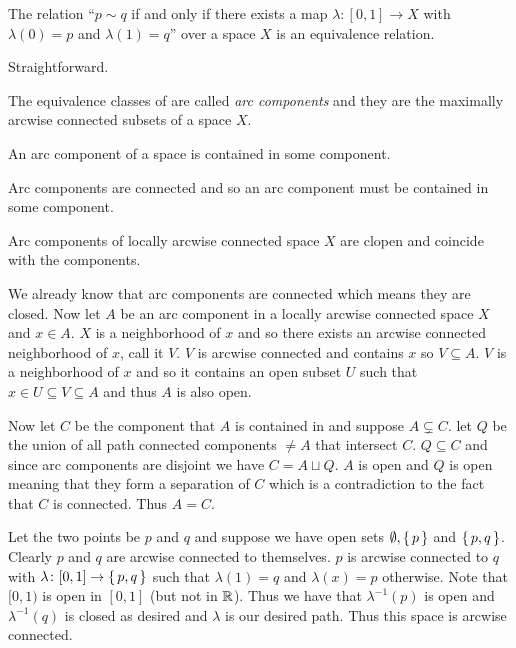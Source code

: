 \documentclass[letterpaper, 11pt, oneside]{book}
\begin{document}
\begin{prop}\label{prop: arc_eq_rel}
  The relation ``$p \sim q$ if and only if there exists a map $\lambda\colon [0, 1] \to X$ with $\lambda(0) = p$ and $\lambda(1) = q$'' over a space $X$ is an equivalence relation.
\end{prop}
\begin{pf}
  Straightforward.
\end{pf}

\begin{defn}
  The equivalence classes of  are called \emph{arc components} and they are the maximally arcwise connected subsets of a space $X$.
\end{defn}

\begin{prop}
  An arc component of a space is contained in some component.
\end{prop}
\begin{pf}
  Arc components are connected and so an arc component must be contained in some component.
\end{pf}

\clearpage

\begin{prop}
  Arc components of locally arcwise connected space $X$ are clopen and coincide with the components.
\end{prop}
\begin{pf}
  We already know that arc components are connected which means they are closed.
  Now let $A$ be an arc component in a locally arcwise connected space $X$ and $x \in A$.
  $X$ is a neighborhood of $x$ and so there exists an arcwise connected neighborhood of $x$, call it $V$.
  $V$ is arcwise connected and contains $x$ so $V \subseteq A$.
  $V$ is a neighborhood of $x$ and so it contains an open subset $U$ such that $x \in U \subseteq V \subseteq A$ and thus $A$ is also open.

  Now let $C$ be the component that $A$ is contained in and suppose $A \subsetneq C$.
  let $Q$ be the union of all path connected components $\neq A$ that intersect $C$.
  $Q \subseteq C$ and since arc components are disjoint we have $C = A \sqcup Q$.
  $A$ is open and  $Q$ is open meaning that they form a separation of $C$ which is a contradiction to the fact that $C$ is connected.
  Thus $A = C$.
\end{pf}

\begin{ex}
  Let the two points be $p$ and $q$ and suppose we have open sets $\emptyset, \set{p}$ and $\set{p, q}$.
  Clearly $p$ and $q$ are arcwise connected to themselves.
  $p$ is arcwise connected to $q$ with $\lambda\colon [0, 1] \to \set{p, q}$ such that $\lambda(1) = q$ and $\lambda(x) = p$ otherwise.
  Note that $[0, 1)$ is open in $[0, 1]$ (but not in $\mathbb{R}$).
  Thus we have that $\lambda^{-1}(p)$ is open and $\lambda^{-1}(q)$ is closed as desired and $\lambda$ is our desired path.
  Thus this space is arcwise connected.
\end{ex}
\end{document}
